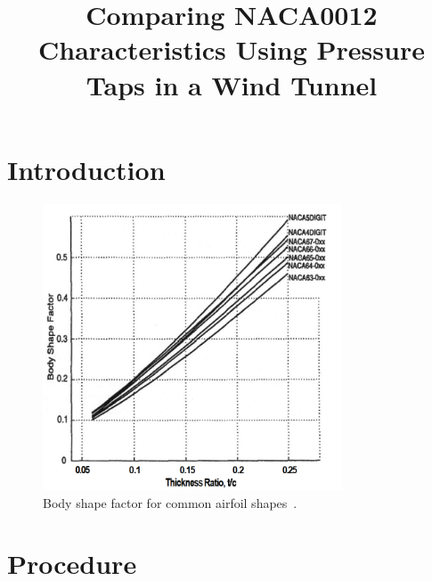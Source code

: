\documentclass[journal,letterpaper]{IEEEtran}
\begin{document}
\title{Comparing NACA0012 Characteristics Using Pressure Taps in a Wind Tunnel}

\author{
}

\maketitle
\thispagestyle{empty}

\begin{abstract}

\end{abstract}

\begin{IEEEkeywords}

\end{IEEEkeywords}


\section{Introduction}



\begin{figure}[H]
    \centering
    \includegraphics[width=3.5in]{shapeFactor}
    \caption{Body shape factor for common airfoil shapes~\cite{shape}.}
    \label{fig:shape}
\end{figure}

\section{Procedure}
\end{document}
